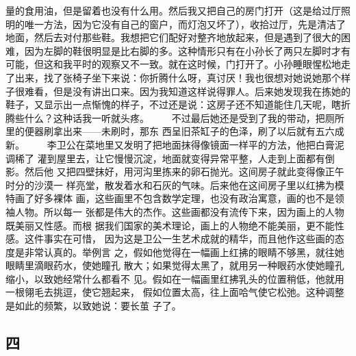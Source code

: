 量的食用油，但是留着也没有什么用。然后我又把自己的房门打开（这是给过厅照 明的唯一方法，因为它没有自己的窗户，而灯泡又坏了），收拾过厅，先是清洁了 地面，然后去对付那些鞋。我想把它们配好对整齐地放起来，但是遇到了很大的困 难，因为左脚的鞋很明显是比右脚的多。这种情形只有在小孙长了两只左脚时才有 可能，但这和我平时的观察又不一致。就在这时候，门打开了。小孙睡眼惺松地走 了出来，找了张椅子坐下来说：你折腾什么呀，真讨厌！我也很想对她说她那个样 子很难看，但是没有讲出口来。因为我知道这样说得罪人。后来她发现我在拣她的 鞋子，又显示出一点惭愧的样子，不过还是说：这房子还不知道能住几天呢，瞎折 腾些什么？这种话我一听就头疼。 　　不过最后她还是受到了我的带动，把厕所里的便器刷拿出来——未刷时，那东 西呈旧茶缸子的色泽，刷了以后就有五六成新。 　　李卫公在菜地里又发明了把地面抹得像镜面一样平的方法，他把白膏泥调稀了 灌到屋里去，让它慢慢沉淀，地面就变得异常平整，人走到上面都有倒影。然后他 又把四壁抹好，用河沟里拣来的卵石抛光。这间房子就此变得像正午时分的沙漠一 样亮堂，散发着水和石灰的气味。后来他在这间房子里以红拂为模特画了好多裸体 画，这些画里不包含数学定理，也没有政治寓意，画的也不是领袖人物。所以每一 张都是伟大的杰作。这些画都没有流传下来，因为画上的人物既美丽又性感。而根 据我们国家的美术理论，画上的人物绝不能美丽，更不能性感。这件事实在可惜， 因为这是卫公一生艺术成就的精华，而且他作这些画的态度是非常认真的。举例言 之，假如他觉得在一幅画上红拂的眼睛不够黑，就往她眼睛里滴眼药水，使她瞳孔 散大；如果觉得太黑了，就用另一种眼药水使她瞳孔缩小，以致她经常什么都看不 见。假如在一幅画里红拂乳头的位置稍低，他就用一根翎毛去挑逗，使它翘起来， 假如位置太高，往上面哈气使它松弛。这种调整是如此的频繁，以致她说：要长茧 子了。 
 
 
\subsection{四} 
 
